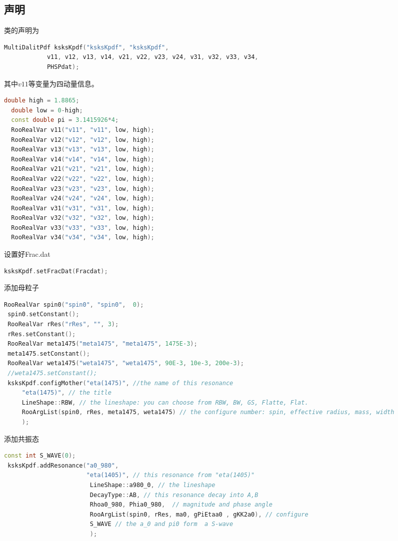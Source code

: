 \documentclass[11pt,a4paper]{article}
\begin{document}
\begin{CJK*}{UTF8}{gbsn}
\subsection{声明}
类的声明为
\begin{lstlisting}[language=c++] 
 MultiDalitPdf ksksKpdf("ksksKpdf", "ksksKpdf",
            v11, v12, v13, v14, v21, v22, v23, v24, v31, v32, v33, v34,
            PHSPdat);
\end{lstlisting}
其中$v11$等变量为四动量信息。
\begin{lstlisting}[language=c++] 
  double high = 1.8865;
  double low = 0-high;
  const double pi = 3.1415926*4;
  RooRealVar v11("v11", "v11", low, high);
  RooRealVar v12("v12", "v12", low, high);
  RooRealVar v13("v13", "v13", low, high);
  RooRealVar v14("v14", "v14", low, high);
  RooRealVar v21("v21", "v21", low, high);
  RooRealVar v22("v22", "v22", low, high);
  RooRealVar v23("v23", "v23", low, high);
  RooRealVar v24("v24", "v24", low, high);
  RooRealVar v31("v31", "v31", low, high);
  RooRealVar v32("v32", "v32", low, high);
  RooRealVar v33("v33", "v33", low, high);
  RooRealVar v34("v34", "v34", low, high);
\end{lstlisting}
设置好Frac.dat
\begin{lstlisting}[language=c++] 
 ksksKpdf.setFracDat(Fracdat);
\end{lstlisting}
添加母粒子
\begin{lstlisting}[language=c++] 
 RooRealVar spin0("spin0", "spin0",  0);
 spin0.setConstant();
 RooRealVar rRes("rRes", "", 3);
 rRes.setConstant();
 RooRealVar meta1475("meta1475", "meta1475", 1475E-3);
 meta1475.setConstant();
 RooRealVar weta1475("weta1475", "weta1475", 90E-3, 10e-3, 200e-3);
 //weta1475.setConstant();
 ksksKpdf.configMother("eta(1475)", //the name of this resonance
     "eta(1475)", // the title
     LineShape::RBW, // the lineshape: you can choose from RBW, BW, GS, Flatte, Flat.
     RooArgList(spin0, rRes, meta1475, weta1475) // the configure number: spin, effective radius, mass, width 
     );
\end{lstlisting}
添加共振态
\begin{lstlisting}[language=c++]
 const int S_WAVE(0);
 ksksKpdf.addResonance("a0_980", 
                       "eta(1405)", // this resonance from "eta(1405)"
                        LineShape::a980_0, // the lineshape
                        DecayType::AB, // this resonance decay into A,B
                        Rhoa0_980, Phia0_980,  // magnitude and phase angle
                        RooArgList(spin0, rRes, ma0, gPiEtaa0 , gKK2a0), // configure
                        S_WAVE // the a_0 and pi0 form  a S-wave
                        );
\end{lstlisting}


\end{CJK*}
\end{document}
